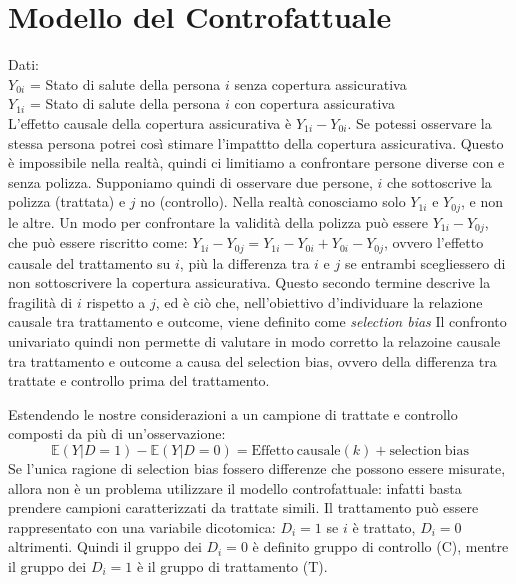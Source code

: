 \chapter{Modello del Controfattuale}

Dati:\\ 
$Y_{0i}$ = Stato di salute della persona $i$ senza copertura assicurativa \\
$Y_{1i}$ = Stato di salute della persona $i$ con copertura assicurativa \\
L'effetto causale della copertura assicurativa è $Y_{1i} - Y_{0i}$. Se potessi osservare 
la stessa persona potrei così stimare l'impattto della copertura assicurativa. Questo è impossibile
nella realtà, quindi ci limitiamo a confrontare persone diverse con e senza polizza.
Supponiamo quindi di osservare due persone, $i$ che sottoscrive la polizza (trattata) e 
$j$ no (controllo). Nella realtà conosciamo solo $Y_{1i}$ e $Y_{0j}$, e non le altre. Un 
modo per confrontare la validità della polizza può essere $Y_{1i} - Y_{0j}$, che può essere 
riscritto come: $Y_{1i} - Y_{0j} = Y_{1i} - Y_{0i} + Y_{0i} - Y_{0j}$, ovvero l'effetto causale
del trattamento su $i$, più la differenza tra $i$ e $j$ se entrambi scegliessero di non 
sottoscrivere la copertura assicurativa. Questo secondo termine descrive la fragilità di $i$
rispetto a $j$, ed è ciò che, nell’obiettivo d'individuare la relazione causale tra trattamento 
e outcome, viene definito come \textit{selection bias} 
Il confronto univariato quindi non permette di valutare in modo corretto la relazoine causale
tra trattamento e outcome a causa del selection bias, ovvero della differenza tra trattate
e controllo prima del trattamento.

Estendendo le nostre considerazioni a un campione di trattate e controllo composti da più
di un'osservazione:
\begin{equation}
    \mathbb{E}(Y|D=1) - \mathbb{E}(Y|D=0) = \mathrm{Effetto\ causale}(k) + \mathrm{selection\ bias}
\end{equation}
Se l'unica ragione di selection bias fossero differenze che possono essere misurate, allora
non è un problema utilizzare il modello controfattuale: infatti basta prendere campioni caratterizzati
da trattate simili.
Il trattamento può essere rappresentato con una variabile dicotomica: $D_i=1$ se $i$ è trattato,
$D_i=0$ altrimenti. Quindi il gruppo dei $D_i=0$ è definito gruppo di controllo (C), mentre il 
gruppo dei $D_i = 1$ è il gruppo di trattamento (T).


